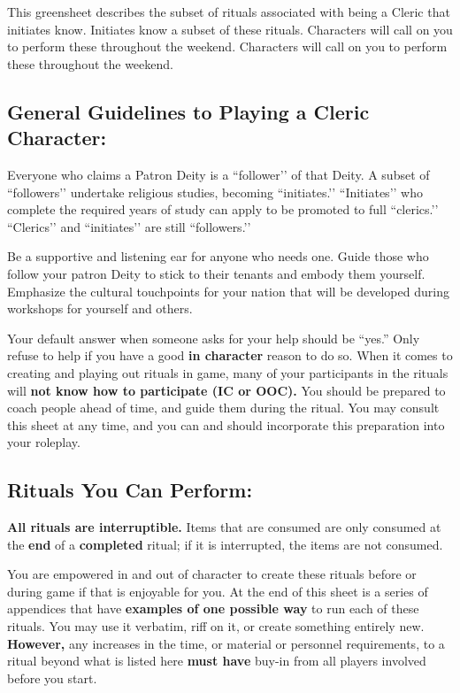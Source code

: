 \documentclass[green]{GL2020}
\begin{document}
\name{\gFPFInitiate{}}

This greensheet describes the subset of rituals associated with being a Cleric that initiates know. Initiates know a subset of these rituals. Characters will call on you to perform these throughout the weekend. Characters will call on you to perform these throughout the weekend. 

\subsection*{General Guidelines to Playing a Cleric Character:}
Everyone who claims a Patron Deity is a ``follower’’ of that Deity. A subset of ``followers’’ undertake religious studies, becoming ``initiates.’’ ``Initiates’’ who complete the required years of study can apply to be promoted to full ``clerics.’’ ``Clerics’’ and ``initiates’’ are still ``followers.’’

Be a supportive and listening ear for anyone who needs one. Guide those who follow your patron Deity to stick to their tenants and embody them yourself. Emphasize the cultural touchpoints for your nation that will be developed during workshops for yourself and others.

Your default answer when someone asks for your help should be ``yes.'' Only refuse to help if you have a good \textbf{in character} reason to do so. When it comes to creating and playing out rituals in game, many of your participants in the rituals will \textbf{not know how to participate (IC or OOC).} You should be prepared to coach people ahead of time, and guide them during the ritual. You may consult this sheet at any time, and you can and should incorporate this preparation into your roleplay.

\subsection*{Rituals You Can Perform:}
\textbf{All rituals are interruptible.} Items that are consumed are only consumed at the \textbf{end} of a \textbf{completed} ritual; if it is interrupted, the items are not consumed.

You are empowered in and out of character to create these rituals before or during game if that is enjoyable for you. At the end of this sheet is a series of appendices that have \textbf{examples of one possible way} to run each of these rituals. You may use it verbatim, riff on it, or create something entirely new. \textbf{However,} any increases in the time, or material or personnel requirements, to a ritual beyond what is listed here \textbf{must have} buy-in from all players involved before you start.
\end{document}
